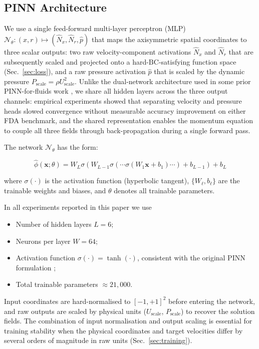 \documentclass[12pt,a4paper]{article}
\newcommand{\bx}{\bm{x}}          %
\newcommand{\Net}{\mathcal{N}}     %
\begin{document}
\subsection{PINN Architecture}
\label{sec:architecture}

We use a single feed-forward multi-layer perceptron (MLP)
$\Net_\theta: (x, r) \mapsto (\hat{N}_x, \hat{N}_r, \hat{p})$
that maps the axisymmetric spatial coordinates to three scalar
outputs: two raw velocity-component activations $\hat{N}_x$ and
$\hat{N}_r$ that are subsequently scaled and projected onto a
hard-BC-satisfying function space (Sec.~\ref{sec:loss}), and a
raw pressure activation $\hat{p}$ that is scaled by the dynamic
pressure $P_{\text{scale}} = \rho U_{\text{scale}}^2$. Unlike
the dual-network architecture used in some prior PINN-for-fluids
work \cite{Raissi2020HFM}, we share all hidden layers across the
three output channels: empirical experiments showed that
separating velocity and pressure heads slowed convergence
without measurable accuracy improvement on either FDA
benchmark, and the shared representation enables the
momentum equation to couple all three fields through
back-propagation during a single forward pass.

The network $\Net_\theta$ has the form:

\begin{equation}
  \hat{\phi}(\bx; \theta) =
  W_L \sigma\!\left(W_{L-1}\sigma\!\left(\cdots
  \sigma(W_1 \bx + b_1)\cdots\right)
  + b_{L-1}\right) + b_L
  \label{eq:network}
\end{equation}

where $\sigma(\cdot)$ is the activation function (hyperbolic
tangent), $\{W_\ell, b_\ell\}$ are the trainable weights and
biases, and $\theta$ denotes all trainable parameters.

In all experiments reported in this paper we use
\begin{itemize}[leftmargin=*, itemsep=2pt]
  \item Number of hidden layers $L = 6$;
  \item Neurons per layer $W = 64$;
  \item Activation function $\sigma(\cdot) = \tanh(\cdot)$,
        consistent with the original PINN formulation
        \cite{Raissi2019PINN1};
  \item Total trainable parameters $\approx 21{,}000$.
\end{itemize}
Input coordinates are hard-normalised to $[-1, +1]^2$ before
entering the network, and raw outputs are scaled by physical
units ($U_{\text{scale}}$, $P_{\text{scale}}$) to recover the
solution fields. The combination of input normalisation and
output scaling is essential for training stability when the
physical coordinates and target velocities differ by several
orders of magnitude in raw units (Sec.~\ref{sec:training}).
\end{document}
